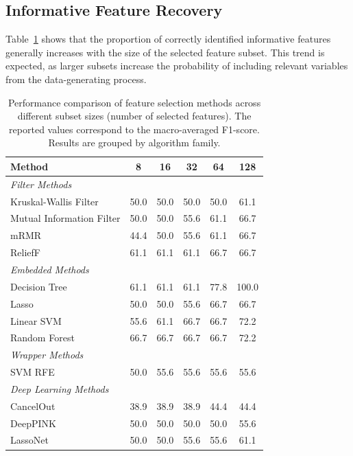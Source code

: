 \subsection{Informative Feature Recovery}
Table~\ref{tab:feature_selection_comparison} shows that the proportion of correctly identified informative features generally increases with the size of the selected feature subset. This trend is expected, as larger subsets increase the probability of including relevant variables from the data-generating process.

\begin{table}[h]
\centering
\begin{tabular}{lccccc}
\hline
Method & 8 & 16 & 32 & 64 & 128 \\
\hline
\multicolumn{6}{l}{\textit{Filter Methods}} \\
Kruskal-Wallis Filter     & 50.0 & 50.0 & 50.0 & 50.0 & 61.1 \\
Mutual Information Filter & 50.0 & 50.0 & 55.6 & 61.1 & 66.7 \\
mRMR                      & 44.4 & 50.0 & 55.6 & 61.1 & 66.7 \\
ReliefF                   & 61.1 & 61.1 & 61.1 & 66.7 & 66.7 \\
\hline
\multicolumn{6}{l}{\textit{Embedded Methods}} \\
Decision Tree             & 61.1 & 61.1 & 61.1 & 77.8 & 100.0 \\
Lasso                     & 50.0 & 50.0 & 55.6 & 66.7 & 66.7 \\
Linear SVM                & 55.6 & 61.1 & 66.7 & 66.7 & 72.2 \\
Random Forest             & 66.7 & 66.7 & 66.7 & 66.7 & 72.2 \\
\hline
\multicolumn{6}{l}{\textit{Wrapper Methods}} \\
SVM RFE                   & 50.0 & 55.6 & 55.6 & 55.6 & 55.6 \\
\hline
\multicolumn{6}{l}{\textit{Deep Learning Methods}} \\
CancelOut                 & 38.9 & 38.9 & 38.9 & 44.4 & 44.4 \\
DeepPINK                  & 50.0 & 50.0 & 50.0 & 50.0 & 55.6 \\
LassoNet                  & 50.0 & 50.0 & 55.6 & 55.6 & 61.1 \\
\hline
\end{tabular}
\caption{Performance comparison of feature selection methods across different subset sizes (number of selected features). The reported values correspond to the macro-averaged F1-score. Results are grouped by algorithm family.}
\label{tab:feature_selection_comparison}
\end{table}

